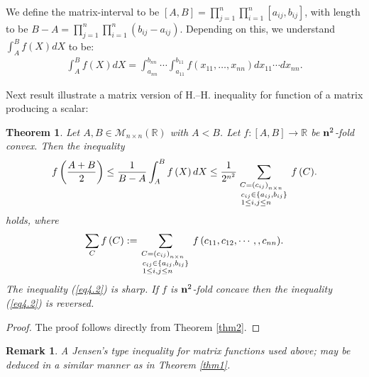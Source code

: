 \documentclass{amsart}
\newtheorem{theorem}{Theorem}
\theoremstyle{plain}
\newtheorem{remark}{Remark}
\numberwithin{equation}{section}
\begin{document}
We define the matrix-interval to be  $\left[ {A,B} \right] =
\prod\limits_{j = 1}^n {\prod\limits_{i = 1}^n {\left[ {a_{ij}
,b_{ij} } \right]} }$, with length to be $B - A = \prod\limits_{j
= 1}^n {\prod\limits_{i = 1}^n {\left( {b_{ij} - a_{ij} } \right)}
} $. Depending on this, we understand  $\int_A^B {f\left( X
\right)dX}$ to be:
\begin{align*}
\int_A^B {f\left( X \right)dX}  = \int_{a_{nn} }^{b_{nn} } {
\cdots \int_{a_{11} }^{b_{11} } {f\left( {x_{11} , \ldots ,x_{nn}
} \right)dx_{11}  \cdots dx_{nn} } }.
\end{align*}

Next result illustrate a matrix version of H.--H. inequality for
function of a matrix producing a scalar:
\begin{theorem}
\label{thm4}Let $A,B\in \mathcal{M}_{n\times n} (\mathbb{R})$ with
$A < B$. Let $f:\left[ {A,B} \right] \to \mathbb{R}$ be
${\bf{n}}^2$-fold convex. Then the inequality
\begin{align}
\label{eq4.2}f\left( {\frac{{A + B}}{2}} \right) \le \frac{1}{{B -
A}}\int_A^B {f\left( X \right)dX}  \le \frac{1}{2^{n^2}}
\sum\limits_{\scriptstyle C = \left( {c_{ij} } \right)_{n \times
n}  \hfill \atop
  {\scriptstyle c_{ij}  \in \left\{ {a_{ij} ,b_{ij} } \right\} \hfill \atop
  \scriptstyle 1 \le i,j \le n \hfill}} {f\left( C \right)}.
\end{align}
holds, where
\begin{align*}
\sum\limits_{C} {f\left( {C} \right)} : =
\sum\limits_{\scriptstyle C = \left( {c_{ij} } \right)_{n \times
n}  \hfill \atop
  {\scriptstyle c_{ij}  \in \left\{ {a_{ij} ,b_{ij} } \right\} \hfill \atop
  \scriptstyle 1 \le i,j \le n \hfill}} {f\left( {c_{11},c_{12},\cdots,,c_{nn} } \right)}.
\end{align*}
The inequality (\ref{eq4.2}) is sharp. If $f$ is ${\bf{n}}^2$-fold
concave then the inequality (\ref{eq4.2}) is reversed.
\end{theorem}

\begin{proof}
The proof follows directly from Theorem \ref{thm2}.
\end{proof}


\begin{remark}
A Jensen's type inequality for matrix functions used above; may be
deduced in a similar manner as in Theorem {\ref{thm1}}.

\end{remark}
\end{document}
